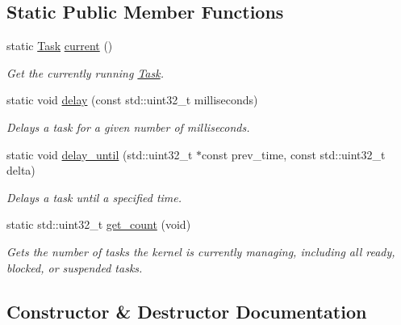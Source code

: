 \subsection*{Static Public Member Functions}
\begin{DoxyCompactItemize}
\item 
static \mbox{\hyperlink{classpros_1_1Task}{Task}} \mbox{\hyperlink{classpros_1_1Task_a510ca3e67e54aa4293438d73148a1d6b}{current}} ()
\begin{DoxyCompactList}\small\item\em Get the currently running \mbox{\hyperlink{classpros_1_1Task}{Task}}. \end{DoxyCompactList}\item 
static void \mbox{\hyperlink{classpros_1_1Task_a4341b580544831eea11b840cf068587b}{delay}} (const std\+::uint32\+\_\+t milliseconds)
\begin{DoxyCompactList}\small\item\em Delays a task for a given number of milliseconds. \end{DoxyCompactList}\item 
static void \mbox{\hyperlink{classpros_1_1Task_aa038d0eeb973ce7fca8689fa5bb91fec}{delay\+\_\+until}} (std\+::uint32\+\_\+t $\ast$const prev\+\_\+time, const std\+::uint32\+\_\+t delta)
\begin{DoxyCompactList}\small\item\em Delays a task until a specified time. \end{DoxyCompactList}\item 
static std\+::uint32\+\_\+t \mbox{\hyperlink{classpros_1_1Task_a9b1eda960abda807cb8447075fc4ea44}{get\+\_\+count}} (void)
\begin{DoxyCompactList}\small\item\em Gets the number of tasks the kernel is currently managing, including all ready, blocked, or suspended tasks. \end{DoxyCompactList}\end{DoxyCompactItemize}


\subsection{Constructor \& Destructor Documentation}
\mbox{\label{classpros_1_1Task_a938ee60b49f29d743315bf05ee9f4a56}} 
